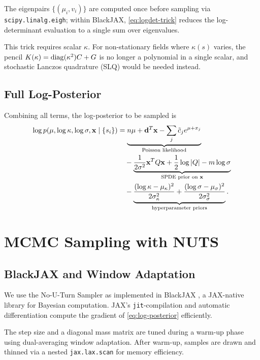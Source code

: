 \documentclass[11pt]{article}
\begin{document}
The eigenpairs $\{(\mu_i, v_i)\}$ are computed once before sampling via
\texttt{scipy.linalg.eigh}; within BlackJAX, \eqref{eq:logdet-trick} reduces
the log-determinant evaluation to a single sum over eigenvalues.

\begin{remark}
This trick requires scalar $\kappa$.  For non-stationary fields where
$\kappa(s)$ varies, the pencil $K(\kappa) = \operatorname{diag}(\kappa^2)C + G$ is no longer
a polynomial in a single scalar, and stochastic Lanczos quadrature (SLQ) would
be needed instead.
\end{remark}

\subsection{Full Log-Posterior}

Combining all terms, the log-posterior to be sampled is
\begin{align}
  \log p(\mu, \log\kappa, \log\sigma, \mathbf{x} \mid \{s_i\})
  &= \underbrace{n\mu + \mathbf{d}^T \mathbf{x} - \sum_j \tilde{c}_j e^{\mu+x_j}}_{\text{Poisson likelihood}} \notag \\
  &\quad - \underbrace{\frac{1}{2\sigma^2}\mathbf{x}^T Q \mathbf{x} + \frac{1}{2}\log|Q| - m\log\sigma}_{\text{SPDE prior on } \mathbf{x}}
  \label{eq:log-posterior} \\
  &\quad - \underbrace{\frac{(\log\kappa - \mu_\kappa)^2}{2\sigma_\kappa^2}
         + \frac{(\log\sigma - \mu_\sigma)^2}{2\sigma_\sigma^2}}_{\text{hyperparameter priors}}. \notag
\end{align}
\section{MCMC Sampling with NUTS}

\subsection{BlackJAX and Window Adaptation}

We use the No-U-Turn Sampler \citep{hoffman2014nuts} as implemented in
BlackJAX \citep{blackjax2024}, a JAX-native library for Bayesian computation.
JAX's \texttt{jit}-compilation and automatic differentiation compute the
gradient of \eqref{eq:log-posterior} efficiently.

The step size and a diagonal mass matrix are tuned during a warm-up phase using
dual-averaging window adaptation.  After warm-up, samples are drawn and thinned
via a nested \texttt{jax.lax.scan} for memory efficiency.
\end{document}
